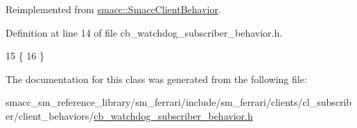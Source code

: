 Reimplemented from \hyperlink{classsmacc_1_1SmaccClientBehavior_ad5d3e1f1697c3cfe66c94cadba948493}{smacc\+::\+Smacc\+Client\+Behavior}.



Definition at line 14 of file cb\+\_\+watchdog\+\_\+subscriber\+\_\+behavior.\+h.


\begin{DoxyCode}
15     \{
16     \}
\end{DoxyCode}


The documentation for this class was generated from the following file\+:\begin{DoxyCompactItemize}
\item 
smacc\+\_\+sm\+\_\+reference\+\_\+library/sm\+\_\+ferrari/include/sm\+\_\+ferrari/clients/cl\+\_\+subscriber/client\+\_\+behaviors/\hyperlink{sm__ferrari_2include_2sm__ferrari_2clients_2cl__subscriber_2client__behaviors_2cb__watchdog__subscriber__behavior_8h}{cb\+\_\+watchdog\+\_\+subscriber\+\_\+behavior.\+h}\end{DoxyCompactItemize}
